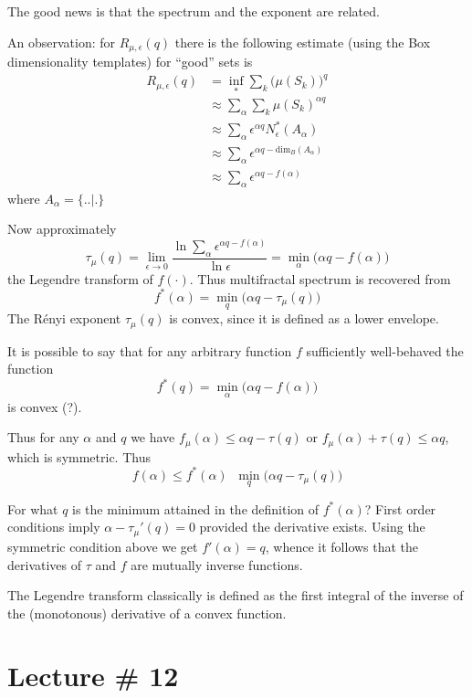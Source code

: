 \documentclass[a4paper]{article}
\newcommand{\defn}{\mathop{\overset{\Delta}{=}}\nolimits}
\begin{document}
The good news is that the spectrum and the exponent are related.

An observation: for $R_{\mu,\epsilon}(q)$ there is the following estimate (using the Box dimensionality templates) for ``good'' sets is
\begin{align*}
	R_{\mu,\epsilon}(q)
	&= \inf_* \sum_k \big(\mu(S_k)\big)^q \\
	&\approx \sum_\alpha \sum_k \mu(S_k)^{\alpha q} \\
	&\approx \sum_\alpha \epsilon^{\alpha q} N^*_\epsilon(A_\alpha) \\
	&\approx \sum_\alpha \epsilon^{\alpha q - \text{dim}_B(A_\alpha)}\\
	&\approx \sum_\alpha \epsilon^{\alpha q - f(\alpha)}
\end{align*}
where $A_\alpha = \Big\{\Big. \Big.\Big\rvert \Big.\Big\}$

Now approximately
\[\tau_\mu(q) = \lim_{\epsilon\to0} \frac{\ln \sum_\alpha \epsilon^{\alpha q - f(\alpha)}}{\ln \epsilon} = \min_\alpha \big( \alpha q - f(\alpha) \big)\]
the Legendre transform of $f(\cdot)$. Thus multifractal spectrum is recovered from
\[f^*(\alpha) = \min_q \Big( \alpha q - \tau_\mu(q) \Big)\]
The R\'enyi exponent $\tau_\mu(q)$ is convex, since it is defined as a lower envelope.

It is possible to say that for any arbitrary function $f$ sufficiently well-behaved the function
\[f^*(q) = \min_\alpha\big(\alpha q - f(\alpha)\big)\]
is convex (?).

Thus for any $\alpha$ and $q$ we have $f_\mu(\alpha)\leq \alpha q - \tau(q)$ or $f_\mu(\alpha) + \tau(q)\leq \alpha q$, which is symmetric. Thus
\[f(\alpha)\leq f^*(\alpha) \defn \min_q \Big( \alpha q - \tau_\mu(q) \Big)\]

For what $q$ is the minimum attained in the definition of $f^*(\alpha)$? First order conditions imply $\alpha - \tau_\mu'(q) = 0$ provided the derivative exists. Using the symmetric condition above we get $f'(\alpha) = q$, whence it follows that the derivatives of $\tau$ and $f$ are mutually inverse functions.

The Legendre transform classically is defined as the first integral of the inverse of the (monotonous) derivative of a convex function.



\section{Lecture \# 12} %
\label{sec:lecture_12}
\end{document}
